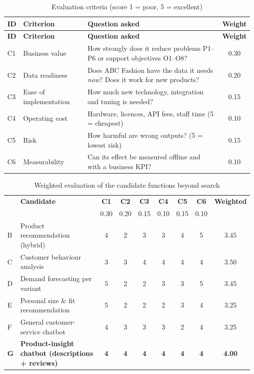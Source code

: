 \begin{xltabular}{\textwidth}{@{}l L{3.1cm} Y c@{}}
\caption{Evaluation criteria (score 1 = poor, 5 = excellent)}\label{tab:criteria}\\
\toprule
\textbf{ID} & \textbf{Criterion} & \textbf{Question asked} & \textbf{Weight} \\ \midrule
\endfirsthead
\toprule
\textbf{ID} & \textbf{Criterion} & \textbf{Question asked} & \textbf{Weight} \\ \midrule
\endhead
\bottomrule
\endlastfoot
C1 & Business value & How strongly does it reduce problems P1--P6 or support objectives O1--O8? & 0.30 \\
C2 & Data readiness & Does ABC Fashion have the data it needs \emph{now}? Does it work for new products? & 0.20 \\
C3 & Ease of implementation & How much new technology, integration and tuning is needed? & 0.15 \\
C4 & Operating cost & Hardware, licences, API fees, staff time (5 = cheapest) & 0.10 \\
C5 & Risk & How harmful are wrong outputs? (5 = lowest risk) & 0.15 \\
C6 & Measurability & Can its effect be measured offline and with a business KPI? & 0.10 \\
\end{xltabular}

\begin{table}[H]
\centering
\small
\caption{Weighted evaluation of the candidate functions beyond search}
\label{tab:scores}
\begin{tabular}{@{}l l cccccc c@{}}
\toprule
 & \textbf{Candidate} & \textbf{C1} & \textbf{C2} & \textbf{C3} & \textbf{C4} & \textbf{C5} & \textbf{C6} & \textbf{Weighted} \\
 & & 0.30 & 0.20 & 0.15 & 0.10 & 0.15 & 0.10 & \\ \midrule
B & Product recommendation (hybrid) & 4 & 2 & 3 & 3 & 4 & 5 & 3.45 \\
C & Customer behaviour analysis & 3 & 3 & 4 & 4 & 4 & 4 & 3.50 \\
D & Demand forecasting per variant & 5 & 2 & 2 & 3 & 3 & 5 & 3.45 \\
E & Personal size \& fit recommendation & 5 & 2 & 2 & 2 & 3 & 4 & 3.25 \\
F & General customer-service chatbot & 4 & 3 & 3 & 3 & 2 & 4 & 3.25 \\
\textbf{G} & \textbf{Product-insight chatbot (descriptions + reviews)} & \textbf{4} & \textbf{4} & \textbf{4} & \textbf{4} & \textbf{4} & \textbf{4} & \textbf{4.00} \\ \bottomrule
\end{tabular}
\end{table}

